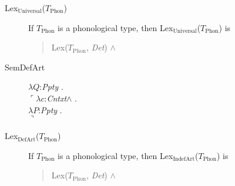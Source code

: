 \begin{description}
 

  
\item[\textnormal{Lex$_{\mathrm{Universal}}$($T_{\mathrm{Phon}}$)}]
        \mbox{}

        If $T_{\mathrm{Phon}}$ is a phonological type, then
        Lex$_{\mathrm{Universal}}$($T_{\mathrm{Phon}}$) is
        \begin{quote}
          Lex($T_{\mathrm{Phon}}$, \textit{Det}) \d{$\wedge$}
        \end{quote}

        \item[\textnormal{SemDefArt}] \mbox{}


                    $\lambda Q$:\textit{Ppty} . \\
  \hspace*{1em}$\ulcorner\lambda c$:\textit{Cntxt}\d{$\wedge$} . \\
  \hspace*{2em}$\lambda P$:\textit{Ppty} . \\
  \hspace*{3em}$\urcorner$


        
      \item[\textnormal{Lex$_{\mathrm{DefArt}}$($T_{\mathrm{Phon}}$)}]
        \mbox{}

        If $T_{\mathrm{Phon}}$ is a phonological type, then
        Lex$_{\mathrm{IndefArt}}$($T_{\mathrm{Phon}}$) is
        \begin{quote}
          Lex($T_{\mathrm{Phon}}$, \textit{Det}) \d{$\wedge$}
        \end{quote}


\end{description}
